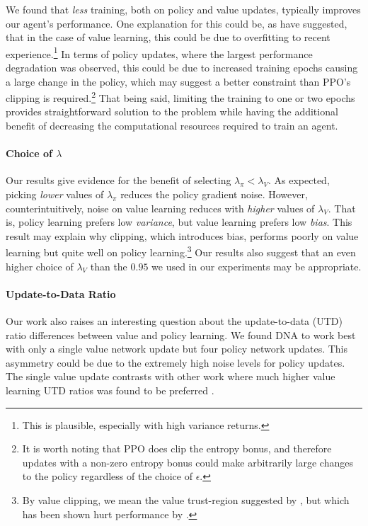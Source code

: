 \documentclass{article}
\begin{document}
We found that \textit{less} training, both on policy and value updates, typically improves our agent's performance. One explanation for this could be, as \cite{cobbe2021phasic} have suggested, that in the case of value learning, this could be due to overfitting to recent experience.\footnote{This is plausible, especially with high variance returns.} In terms of policy updates, where the largest performance degradation was observed, this could be due to increased training epochs causing a large change in the policy, which may suggest a better constraint than PPO's clipping is required.\footnote{It is worth noting that PPO does clip the entropy bonus, and therefore updates with a non-zero entropy bonus could make arbitrarily large changes to the policy regardless of the choice of $\epsilon$.} That being said, limiting the training to one or two epochs provides straightforward solution to the problem while having the additional benefit of decreasing the computational resources required to train an agent. 

\paragraph{Choice of $\lambda$}

Our results give evidence for the benefit of selecting $\lambda_{\pi} < \lambda_V$. As expected, picking \textit{lower} values of $\lambda_\pi$ reduces the policy gradient noise. However, counterintuitively, noise on value learning reduces with \textit{higher} values of $\lambda_V$. That is, policy learning prefers low \textit{variance}, but value learning prefers low \textit{bias}. This result may explain why clipping, which introduces bias, performs poorly on value learning but quite well on policy learning.\footnote{By value clipping, we mean the value trust-region suggested by \cite{schulman2015high}, but which has been shown hurt performance by \cite{andrychowicz2020matters}.} Our results also suggest that an even higher choice of $\lambda_V$ than the $0.95$ we used in our experiments may be appropriate.





\paragraph{Update-to-Data Ratio}
\label{sec:update_ratio}

Our work also raises an interesting question about the update-to-data (UTD) ratio differences between value and policy learning. We found DNA to work best with only a single value network update but four policy network updates. This asymmetry could be due to the extremely high noise levels for policy updates. The single value update contrasts with other work where much higher value learning UTD ratios was found to be preferred \cite{aitchison2019optimal, chen2021randomized}.
\end{document}
